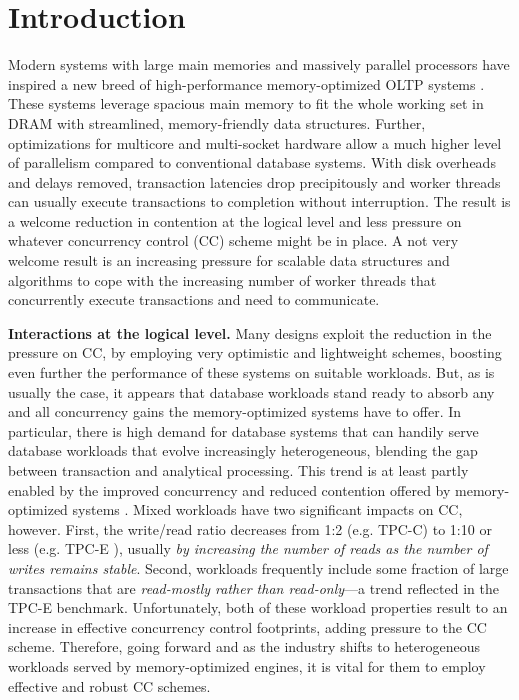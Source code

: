 
\section{Introduction}

Modern systems with large main memories and massively parallel processors have inspired a new breed of high-performance memory-optimized OLTP systems \cite{Kallman+08,PandisJHA10,KemperN11,LarsonBDFPZ11,TuZKLM13}. These systems leverage spacious main memory to fit the whole working set in DRAM with streamlined, memory-friendly data structures. Further, optimizations for multicore and multi-socket hardware allow a much higher level of parallelism compared to conventional database systems. With disk overheads and delays removed, transaction latencies drop precipitously and worker threads can usually execute transactions to completion without interruption. The result is a welcome reduction in contention at the logical level and less pressure on whatever concurrency control (CC) scheme might be in place. A not very welcome result is an increasing pressure for scalable data structures and algorithms to cope with the increasing number of worker threads that concurrently execute transactions and need to communicate.


\vspace{2mm}
{\bf Interactions at the logical level.} 
Many designs exploit the reduction in the pressure on CC, by employing very optimistic and lightweight schemes, boosting even further the performance of these systems on suitable workloads.
But, as is usually the case, it appears that database workloads stand ready to absorb any and all concurrency gains the memory-optimized systems have to offer. In particular, there is high demand for database systems that can handily serve database workloads that evolve increasingly heterogeneous, blending the gap between transaction and analytical processing. This trend is at least partly enabled by the improved concurrency and reduced contention offered by memory-optimized systems \cite{Farber+12}. Mixed workloads have two significant impacts on CC, however. First, the write/read ratio decreases from 1:2 (e.g. TPC-C) to 1:10 or less (e.g. TPC-E \cite{Chen+10,TozunPKJA13}), usually {\it by increasing the number of reads as the number of writes remains stable}. 
Second, workloads frequently include some fraction of large transactions that are {\it read-mostly rather than read-only}---a trend reflected in the TPC-E benchmark. Unfortunately, both of these workload properties result to an increase in effective concurrency control footprints, adding pressure to the CC scheme. 
Therefore, going forward and as the industry shifts to heterogeneous workloads served by memory-optimized engines, it is vital for them to employ effective and robust CC schemes. 

